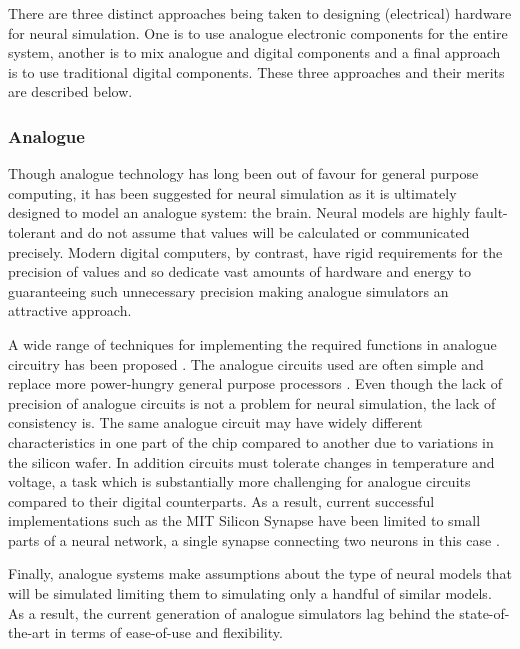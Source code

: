 			There are three distinct approaches being taken to designing (electrical)
			hardware for neural simulation. One is to use analogue electronic components
			for the entire system, another is to mix analogue and digital components and
			a final approach is to use traditional digital components. These three
			approaches and their merits are described below.
			
			\subsubsection{Analogue}
			
				Though analogue technology has long been out of favour for general purpose
				computing, it has been suggested for neural simulation as it is ultimately
				designed to model an analogue system: the brain. Neural models are highly
				fault-tolerant and do not assume that values will be calculated or
				communicated precisely. Modern digital computers, by contrast, have rigid
				requirements for the precision of values and so dedicate vast amounts of
				hardware and energy to guaranteeing such unnecessary precision making
				analogue simulators an attractive approach.
				
				A wide range of techniques for implementing the required functions in
				analogue circuitry has been proposed
				\cite{graf86,holler89,agranat90,azghadi13}. The analogue circuits used
				are often simple and replace more power-hungry general purpose
				processors \cite{misra10}. Even though the lack of precision of analogue
				circuits is not a problem for neural simulation, the lack of consistency
				is. The same analogue circuit may have widely different characteristics
				in one part of the chip compared to another due to variations in the
				silicon wafer. In addition circuits must tolerate changes in temperature
				and voltage, a task which is substantially more challenging for analogue
				circuits compared to their digital counterparts. As a result, current
				successful implementations such as the MIT Silicon Synapse have been
				limited to small parts of a neural network, a single synapse connecting
				two neurons in this case \cite{rachmuth11}.
				
				Finally, analogue systems make assumptions about the type of neural models
				that will be simulated limiting them to simulating only a handful of
				similar models. As a result, the current generation of analogue
				simulators lag behind the state-of-the-art in terms of ease-of-use and
				flexibility.
			
